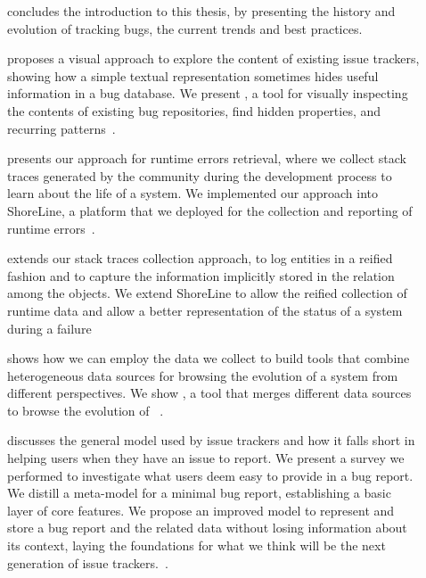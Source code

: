 \begin{description}
  \item[] concludes the introduction to this thesis, by presenting the history and evolution of tracking bugs, the current trends and best practices.

  \item[] proposes a visual approach to explore the content of existing issue trackers, showing how a simple textual representation sometimes hides useful information in a bug database.
  We present \ib, a tool for visually inspecting the contents of existing bug repositories, find hidden properties, and recurring patterns~\cite{DalS2013a,DalS2014a}.

  \item[] presents our approach for runtime errors retrieval, where we collect stack traces generated by the community during the development process to learn about the life of a system.
  We implemented our approach into ShoreLine, a platform that we deployed for the collection and reporting of runtime errors~\cite{DalS2015a}.

  \item[] extends our stack traces collection approach, to log entities in a reified fashion and to capture the information implicitly stored in the relation among the objects.
  We extend ShoreLine to allow the reified collection of runtime data and allow a better representation of the status of a system during a failure~\cite{DalS2017b}

  \item[] shows how we can employ the data we collect to build tools that combine heterogeneous data sources for browsing the evolution of a system from different perspectives.
  We show \blend, a tool that merges different data sources to browse the evolution of \pha~\cite{DalS2015b}.

  \item[] discusses the general model used by issue trackers and how it falls short in helping users when they have an issue to report.
  We present a survey we performed to investigate what users deem easy to provide in a bug report.
  We distill a meta-model for a minimal bug report, establishing a basic layer of core features.
  We propose an improved model to represent and store a bug report and the related data without losing information about its context, laying the foundations for what we think will be the next generation of issue trackers.~\cite{DalS2016a}.


\end{description}
